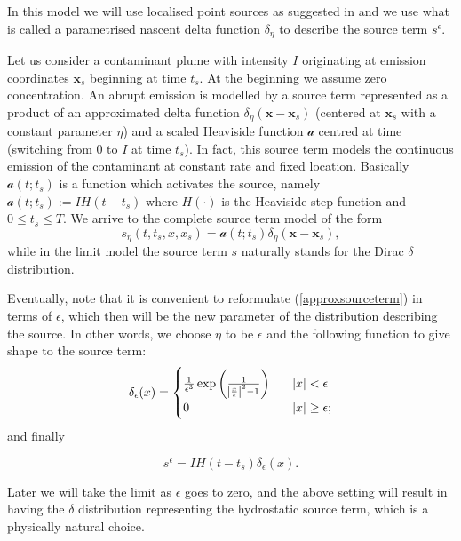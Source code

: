 \documentclass[12pt]{report}
\numberwithin{theorem}{chapter}
\numberwithin{corollary}{chapter}
\numberwithin{lemma}{chapter}
\numberwithin{remark}{chapter}
\numberwithin{definition}{chapter}
\numberwithin{prop}{chapter}
\begin{document}
In this model we will use localised point sources as suggested in \cite{zhuk2016source} and we use what is called a parametrised nascent delta function $\delta_\eta$ to describe the source term $s^\epsilon$.

Let us consider a contaminant plume with intensity $I$ originating at emission coordinates $\mathbf{x}_s$ beginning at time $t_s$. At the beginning we assume zero concentration.
An abrupt emission is modelled by a source term represented as a product of an approximated delta function $\delta_\eta (\mathbf{x} - \mathbf{x}_s)$ (centered at $\mathbf{x}_s$ with a constant parameter $\eta$) and a scaled Heaviside function $\mathscr{a}$ centred at time (switching from 0 to $I$ at time $t_s$).
In fact, this source term models the continuous emission of the contaminant at constant rate and fixed location.
Basically $\mathscr{a}(t;t_s)$ is a function which activates the source, namely $\mathscr{a}(t;t_s) := IH(t - t_s)$ where $H(\cdot)$ is the Heaviside step function and $0 \leq t_s \leq T.$ We arrive to the complete source term model of the form
%
\begin{equation} \label{approxsourceterm}
  s_\eta (t, t_s, x, x_s) = \mathscr{a}(t; t_s) \delta_\eta (\mathbf{x} - \mathbf{x}_s),
\end{equation}
%
while in the limit model the source term $s$ naturally stands for the Dirac $\delta$ distribution.
    
Eventually, note that it is convenient to reformulate (\ref{approxsourceterm}) in terms of $\epsilon$, which then will be the new parameter of the distribution describing the source. In other words, we choose $\eta$ to be $\epsilon$ and the following function to give shape to the source term:
%
\begin{equation} \label{shapedefinition}
\delta_\epsilon (x) = 
  \begin{cases}
       \frac{1}{\epsilon^3} \exp{\bigg ( \frac{1}{\abs{{\frac{x}{\epsilon}}}^2-1} \bigg ) } &\quad \abs{x} < \epsilon \\
       0 &\quad \abs{x} \geq \epsilon; \\
  \end{cases}
\end{equation}
%
and finally

\begin{equation} \label{sourcedefinition}
  s^\epsilon = I H(t-t_s) \delta_\epsilon (x).
\end{equation}

Later we will take the limit as $\epsilon$ goes to zero, and the above setting will result in having the $\delta$ distribution representing the hydrostatic source term, which is a physically natural choice.
\end{document}
